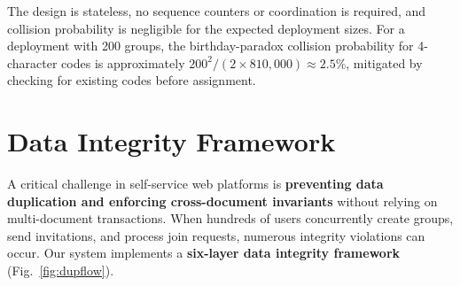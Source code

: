 \documentclass[11pt,a4paper]{article}
\theoremstyle{plain}
\theoremstyle{definition}
\theoremstyle{remark}
\begin{document}
The design is stateless, no sequence counters or coordination is required, and collision probability is negligible for the expected deployment sizes. For a deployment with 200 groups, the birthday-paradox collision probability for 4-character codes is approximately $200^2 / (2 \times 810{,}000) \approx 2.5\%$, mitigated by checking for existing codes before assignment.

\section{Data Integrity Framework}
\label{sec:integrity}

A critical challenge in self-service web platforms is \textbf{preventing data duplication and enforcing cross-document invariants} without relying on multi-document transactions. When hundreds of users concurrently create groups, send invitations, and process join requests, numerous integrity violations can occur. Our system implements a \textbf{six-layer data integrity framework} (Fig.~\ref{fig:dupflow}).
\end{document}

